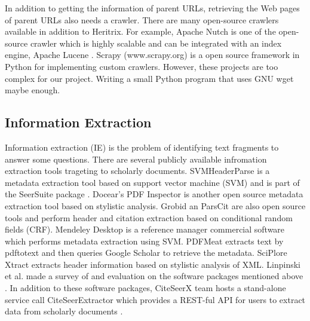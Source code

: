 \documentclass[prodmode]{acmsmall} %
\begin{document}
In addition to getting the information of parent URLs, retrieving the Web pages of parent URLs also needs a crawler. There are many open-source crawlers available in addition to Heritrix. For example, Apache Nutch is one of the open-source crawler  which is highly scalable and can be integrated with an index engine, Apache Lucene \cite{Khare2004}. Scrapy (www.scrapy.org) is a open source framework in Python for implementing custom crawlers. However, these projects are too complex for our project. Writing a small Python program that uses GNU wget \cite{Niksic1996} maybe enough.

\subsection{Information Extraction}

Information extraction (IE) is the problem of identifying text fragments to answer some questions. There are several publicly available infromation extraction tools trageting to scholarly documents. SVMHeaderParse is a metadata extraction tool based on support vector machine (SVM) and is part of the SeerSuite package \cite{Han2003}.  Docear's PDF Inspector is another open source metadata extraction tool based on stylistic analysis. Grobid \cite{Lopez2009} an ParsCit \cite{Councill2008} are also open source tools and perform header and citation extraction based on conditional random fields (CRF). Mendeley Desktop is a reference manager commercial software which performs metadata extraction using SVM. PDFMeat \cite{Aumuller2011} extracts text by pdftotext and then queries Google Scholar to retrieve the metadata. SciPlore Xtract \cite{Beel2010} extracts header information based on stylistic analysis of XML. Linpinski et al. made a survey of and evaluation on the software packages mentioned above \cite{Lipinski2013}. In addition to these software packages, CiteSeerX team hosts a stand-alone service call CiteSeerExtractor which provides a REST-ful API for users to extract data from scholarly documents \cite{Williams2014}.
\end{document}
